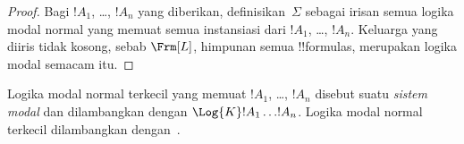 \documentclass[../../../include/open-logic-section]{subfiles}
\begin{document}
\begin{proof}
  Bagi $!A_1$, \dots, $!A_n$ yang diberikan, definisikan~$\Sigma$ sebagai
  irisan semua logika modal normal yang memuat semua instansiasi dari
  $!A_1$, \dots, $!A_n$. Keluarga yang diiris tidak kosong, sebab $\Frm[L]$,
  himpunan semua !!{formula}s, merupakan logika modal semacam itu.
\end{proof}

\begin{defn}
Logika modal normal terkecil yang memuat $!A_1$, \dots, $!A_n$ disebut suatu
\emph{sistem modal} dan dilambangkan dengan $\Log{K} !A_1 \dots !A_n$.
Logika modal normal terkecil dilambangkan dengan~.
\end{defn}
\end{document}
